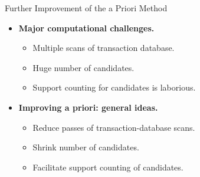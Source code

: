 \begin{frame}{Further Improvement of the a Priori Method}
	\begin{itemize}
		\item \textbf{Major computational challenges.}
		      \begin{itemize}
			      \item Multiple scans of transaction database.
			      \item Huge number of candidates.
			      \item Support counting for candidates is laborious.
		      \end{itemize}
		\item \textbf{Improving a priori: general ideas.}
		      \begin{itemize}
			      \item Reduce passes of transaction-database scans.
			      \item Shrink number of candidates.
			      \item Facilitate support counting of candidates.
		      \end{itemize}
	\end{itemize}
\end{frame}


